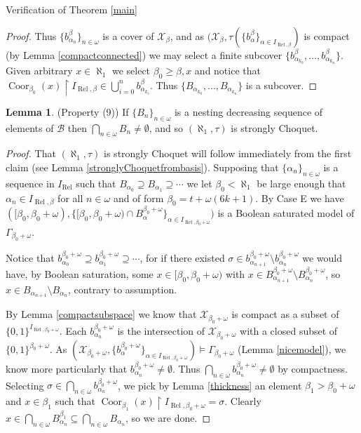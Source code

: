 \documentclass{amsart}
\theoremstyle{definition}\newtheorem{theorem}{Theorem}
\theoremstyle{definition}\newtheorem{bigtheorem}{Theorem}
\numberwithin{theorem}{section}
\theoremstyle{definition}\newtheorem{corollary}[theorem]{Corollary}
\theoremstyle{definition}\newtheorem{proposition}[theorem]{Proposition}
\theoremstyle{definition}\newtheorem{definition}[theorem]{Definition}
\theoremstyle{definition}\newtheorem{question}[theorem]{Question}
\theoremstyle{definition}\newtheorem{example}[theorem]{Example}
\theoremstyle{definition}\newtheorem{remark}[theorem]{Remark}
\theoremstyle{definition}\newtheorem{note}[theorem]{Note}
\theoremstyle{definition}\newtheorem{lemma}[theorem]{Lemma}
\theoremstyle{definition}\newtheorem{fact}[theorem]{Fact}
\theoremstyle{definition}\newtheorem{define}[theorem]{Definition}
\theoremstyle{definition}\newtheorem{definitions}[theorem]{Definitions}
\theoremstyle{definition}\newtheorem{claim}[theorem]{Claim}
\theoremstyle{definition}\newtheorem{obs}[theorem]{Observation}
\theoremstyle{definition}\newtheorem{construction}[theorem]{Construction}
\newcommand{\Rel}{\operatorname{Rel}}
\newcommand{\X}{\mathcal{X}}
\newcommand{\Coor}{\operatorname{Coor}}
\newcommand{\Bo}{\mathcal{B}}
\begin{document}
\begin{section}{Verification of Theorem \ref{main}}
\begin{proof}
Thus $\{b_{\alpha_n}^{\beta}\}_{n\in \omega}$ is a cover of $\X_{\beta}$, and as $(\X_{\beta}, \tau(\{b_{\alpha}^{\beta}\}_{\alpha \in I_{\Rel, \beta}})$ is compact (by Lemma \ref{compactconnected}) we may select a finite subcover $\{b_{\alpha_{k_0}}^{\beta}, \ldots, b_{\alpha_{k_n}}^{\beta}\}$.  Given arbitrary $x \in \aleph_1$ we select $\beta_0 \geq \beta, x$ and notice that $\Coor_{\beta_0}(x) \upharpoonright I_{\Rel, \beta} \in \bigcup_{i = 0}^n b_{\alpha_{k_i}}^{\beta}$.  Thus $\{B_{\alpha_{k_0}}, \ldots, B_{\alpha_{k_n}}\}$ is a subcover.
\end{proof}

\begin{lemma}\label{nonemptyintersectionindeed}(Property (9))  If $\{B_n\}_{n\in \omega}$ is a nesting decreasing sequence of elements of $\Bo$ then $\bigcap_{n\in \omega} B_n \neq \emptyset$, and so $(\aleph_1, \tau)$ is strongly Choquet.
\end{lemma}

\begin{proof}  That $(\aleph_1, \tau)$ is strongly Choquet will follow immediately from the first claim (see Lemma \ref{stronglyChoquetfrombasis}).  Supposing that $\{\alpha_n\}_{n\in \omega}$ is a sequence in $I_{\Rel}$ such that $B_{\alpha_0} \supseteq B_{\alpha_1} \supseteq \cdots$ we let $\beta_0 < \aleph_1$ be large enough that $\alpha_n \in I_{\Rel, \beta}$ for all $n\in \omega$ and of form $\beta_0 = t + \omega(6k + 1)$.  By Case E we have $([\beta_0, \beta_0 + \omega), \{[\beta_0, \beta_0 + \omega) \cap B_{\alpha}^{\beta_0 + \omega}\}_{\alpha \in I_{\Rel, \beta_0 + \omega}})$ is a Boolean saturated model of $\Gamma_{\beta_0 + \omega}$.

Notice that $b_{\alpha_0}^{\beta_0 + \omega} \supseteq b_{\alpha_1}^{\beta_0 + \omega} \supseteq \cdots$, for if there existed $\sigma \in b_{\alpha_{n + 1}}^{\beta_0 + \omega} \setminus b_{\alpha_n}^{\beta_0 + \omega}$ we would have, by Boolean saturation, some $x\in [\beta_0, \beta_0 + \omega)$ with $x \in B_{\alpha_{n+1}}^{\beta_0 + \omega} \setminus B_{\alpha_n}^{\beta_0 + \omega}$, so $x \in B_{\alpha_{n+1}} \setminus B_{\alpha_n}$, contrary to assumption.

By Lemma \ref{compactsubspace} we know that $\X_{\beta_0 + \omega}$ is compact as a subset of $\{0, 1\}^{I_{\Rel, \beta _0+ \omega}}$.  Each $b_{\alpha_n}^{\beta_0 + \omega}$ is the intersection of $\X_{\beta_0 + \omega}$ with a closed subset of $\{0, 1\}^{\beta_0 + \omega}$.  As $(\X_{\beta_0 + \omega}, \{b_{\alpha}^{\beta_0 + \omega}\}_{\alpha \in I_{\Rel, \beta_0 + \omega}}) \models \Gamma_{\beta_0 + \omega}$ (Lemma \ref{nicemodel}), we know more particularly that $b_{\alpha_n}^{\beta_0 + \omega} \neq \emptyset$.  Thus $\bigcap_{n \in \omega} b_{\alpha_n}^{\beta_0 + \omega} \neq \emptyset$ by compactness.  Selecting $\sigma \in \bigcap_{n \in \omega} b_{\alpha_n}^{\beta_0 + \omega}$, we pick by Lemma \ref{thickness} an element $\beta_1 > \beta_0 + \omega$ and $x \in \beta_1$ such that $\Coor_{\beta_1}(x) \upharpoonright I_{\Rel, \beta_0 + \omega} = \sigma$.  Clearly $x \in \bigcap_{n \in \omega} B_{\alpha_n}^{\beta_1} \subseteq  \bigcap_{n \in \omega} B_{\alpha_n}$, so we are done.



\end{proof}
\end{section}
\end{document}
